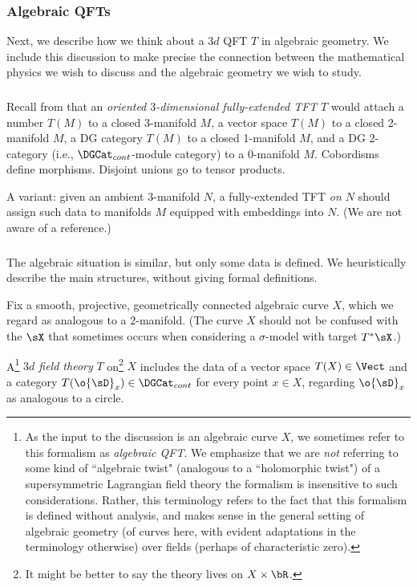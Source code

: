 
\subsubsection{Algebraic QFTs}

Next, we describe how we think about a $3d$ QFT $T$ in algebraic geometry.
We include this discussion to make precise the connection between the mathematical
physics we wish to discuss and the algebraic geometry we wish to study.

\subsubsection{}

Recall from \cite{lurie-tft} that an \emph{oriented $3$-dimensional fully-extended TFT}
$T$ would
attach a number $T(M)$ to a closed 3-manifold $M$, a vector space
$T(M)$ to a closed 2-manifold $M$, a DG category $T(M)$ to a closed
1-manifold $M$, and a DG 2-category (i.e., $\DGCat_{cont}$-module
category) to a 0-manifold $M$. Cobordisms define morphisms. Disjoint unions
go to tensor products.

A variant: given an ambient $3$-manifold $N$, a fully-extended TFT \emph{on $N$} should
assign such data to manifolds $M$ equipped with embeddings into $N$.
(We are not aware of a reference.)

\subsubsection{}\label{ss:alg-3d}

The algebraic situation is similar, but only some data is defined.
We heuristically describe the main structures, without giving formal definitions.

Fix a smooth, projective, geometrically connected algebraic curve $X$,
which we regard as analogous to a $2$-manifold. (The curve $X$ should not be confused
with the $\sX$ that sometimes occurs when considering a $\sigma$-model with
target $T^*\sX$.)

A\footnote{As the input to the discussion is an algebraic curve $X$,
we sometimes refer to this formalism as \emph{algebraic QFT}.
We emphasize that we are \emph{not} referring to some kind of
``algebraic twist" (analogous to a ``holomorphic twist")
of a supersymmetric Lagrangian field theory \textemdash{}  the
formalism is insensitive to such considerations. Rather, this
terminology refers to the fact that this formalism is defined without
analysis, and makes sense in the general setting of algebraic geometry (of
curves here, with evident adaptations in the terminology otherwise)
over fields (perhaps of characteristic zero).}
\emph{$3d$ field theory} $T$ on\footnote{It might be better
to say the theory lives on $X \times \bR$.} $X$ includes the
data of a vector space $T(X) \in \Vect$ and a category
$T(\o{\sD}_x) \in \DGCat_{cont}$ for every point $x \in X$,
regarding $\o{\sD}_x$ as analogous to a circle.

